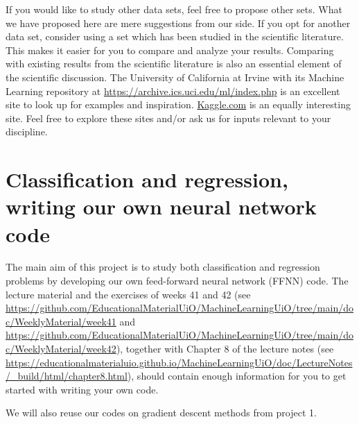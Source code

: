 \documentclass[11pt,a4paper]{article}
\begin{document}
If you would like to study other data sets, feel free to propose other sets.
What we have proposed here are mere suggestions from our side.  If you opt for
another data set, consider using a set which has been studied in the
scientific literature.  This makes it easier for you to compare and analyze
your results.  Comparing with existing results from the scientific literature
is also an essential element of the scientific discussion.  The University of
California at Irvine with its Machine Learning repository at
\url{https://archive.ics.uci.edu/ml/index.php} is an excellent site to look up
for examples and inspiration.  \href{https://www.kaggle.com/}{Kaggle.com} is
an equally interesting site.  Feel free to explore these sites and/or ask us
for inputs relevant to your discipline.

\section*{Classification and regression, writing our own neural network code}

The main aim of this project is to study both classification and regression
problems by developing our own feed-forward neural network (FFNN) code.  The
lecture material and the exercises of weeks 41 and 42 (see
\url{https://github.com/EducationalMaterialUiO/MachineLearningUiO/tree/main/doc/WeeklyMaterial/week41}
and
\url{https://github.com/EducationalMaterialUiO/MachineLearningUiO/tree/main/doc/WeeklyMaterial/week42}),
together with Chapter 8 of the lecture notes (see
\url{https://educationalmaterialuio.github.io/MachineLearningUiO/doc/LectureNotes/_build/html/chapter8.html}),
should contain enough information for you to get started with writing your
own code.

We will also reuse our codes on gradient descent methods from project 1.
\end{document}
